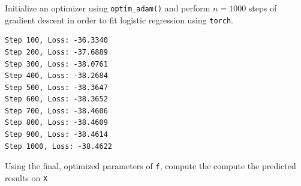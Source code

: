 \documentclass[
  letterpaper,
  DIV=11,
  numbers=noendperiod]{scrartcl}
\newenvironment{Shaded}{\begin{snugshade}}{\end{snugshade}}
\newcommand{\AttributeTok}[1]{\textcolor[rgb]{0.40,0.45,0.13}{#1}}
\newcommand{\CommentTok}[1]{\textcolor[rgb]{0.37,0.37,0.37}{#1}}
\newcommand{\ControlFlowTok}[1]{\textcolor[rgb]{0.00,0.23,0.31}{#1}}
\newcommand{\DecValTok}[1]{\textcolor[rgb]{0.68,0.00,0.00}{#1}}
\newcommand{\FloatTok}[1]{\textcolor[rgb]{0.68,0.00,0.00}{#1}}
\newcommand{\FunctionTok}[1]{\textcolor[rgb]{0.28,0.35,0.67}{#1}}
\newcommand{\NormalTok}[1]{\textcolor[rgb]{0.00,0.23,0.31}{#1}}
\newcommand{\OtherTok}[1]{\textcolor[rgb]{0.00,0.23,0.31}{#1}}
\newcommand{\SpecialCharTok}[1]{\textcolor[rgb]{0.37,0.37,0.37}{#1}}
\newcommand{\StringTok}[1]{\textcolor[rgb]{0.13,0.47,0.30}{#1}}
\begin{document}
Initialize an optimizer using \texttt{optim\_adam()} and perform
\(n=1000\) steps of gradient descent in order to fit logistic regression
using \texttt{torch}.

\begin{Shaded}
\end{Shaded}

\begin{verbatim}
Step 100, Loss: -36.3340
Step 200, Loss: -37.6889
Step 300, Loss: -38.0761
Step 400, Loss: -38.2684
Step 500, Loss: -38.3647
Step 600, Loss: -38.3652
Step 700, Loss: -38.4606
Step 800, Loss: -38.4609
Step 900, Loss: -38.4614
Step 1000, Loss: -38.4622
\end{verbatim}

Using the final, optimized parameters of \texttt{f}, compute the compute
the predicted results on \texttt{X}

\begin{Shaded}
\end{Shaded}
\end{document}
